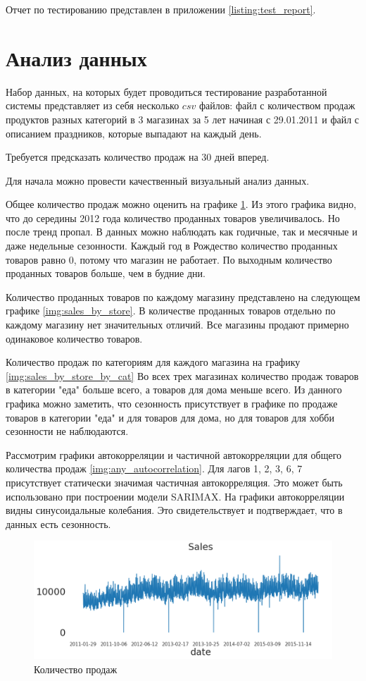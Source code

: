 Отчет по тестированию представлен в приложении \ref{listing:test_report}.

\section{Анализ данных}

Набор данных, на которых будет проводиться тестирование разработанной системы
представляет из себя несколько $ csv $ файлов: файл с количеством продаж
продуктов разных категорий в 3 магазинах за 5 лет начиная с 29.01.2011
и файл с описанием праздников, которые выпадают на каждый день.

Требуется предсказать количество продаж на 30 дней вперед.

Для начала можно провести качественный визуальный анализ данных.

Общее количество продаж можно оценить на графике \ref{img:all_sales}.
Из этого графика видно, что до середины 2012 года количество проданных
товаров увеличивалось. Но после тренд пропал. В данных можно наблюдать
как годичные, так и месячные и даже недельные сезонности. Каждый год
в Рождество количество проданных товаров равно 0, потому что магазин не работает.
По выходным количество проданных товаров больше, чем в будние дни.

Количество проданных товаров по каждому магазину представлено на следующем графике \ref{img:sales_by_store}.
В количестве проданных товаров отдельно по каждому магазину нет значительных отличий.
Все магазины продают примерно одинаковое количество товаров.

Количество продаж по категориям для каждого магазина на графику \ref{img:sales_by_store_by_cat}
Во всех трех магазинах количество продаж товаров в категории "еда" больше всего,
а товаров для дома меньше всего. Из данного графика можно заметить, что сезонность
присутствует в графике по продаже товаров в категории "еда" и для товаров для дома, но
для товаров для хобби сезонности не наблюдаются.

Рассмотрим графики автокорреляции и частичной автокорреляции для общего количества продаж
\ref{img:any_autocorrelation}.
Для лагов 1, 2, 3, 6, 7 присутствует статически значимая частичная автокорреляция.
Это может быть использовано при построении модели SARIMAX.
На графики автокорреляции видны синусоидальные колебания. Это свидетельствует и подтверждает,
что в данных есть сезонность.

\def\figurename{Рис}
\begin{figure}[t]
	\centering
	\includegraphics[width=0.9\columnwidth]{./img/all_sales.png}
	\caption{Количество продаж}
	\label{img:all_sales}
\end{figure}


